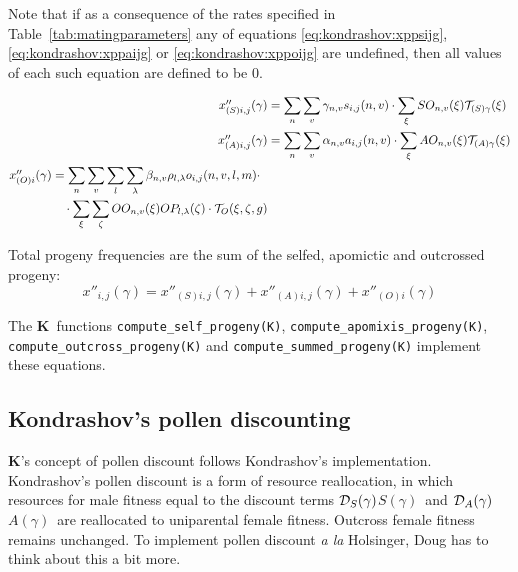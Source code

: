 \documentclass[10pt,twoside,a4paper,fleqn]{report}
\numberwithin{equation}{section}  %
\newcommand{\K}{{\bf K}}
\newcommand{\Kcode}[1]{{\tt #1}}
\newcommand{\xppsijg}{\mbox{$x''_{(S)i,j}(\gamma)$}}
\newcommand{\xppaijg}{\mbox{$x''_{(A)i,j}(\gamma)$}}
\newcommand{\xppoig}{\mbox{$x''_{(O)i}(\gamma)$}}
\newcommand{\xppoijg}{\xppoig}
\newcommand{\xppijg}{\mbox{$x''_{i,j}(\gamma)$}}
\newcommand{\Sg}{\mbox{$S(\gamma)$}}
\newcommand{\DSg}{\mbox{${\cal D}_{S}(\gamma)$}}
\newcommand{\Ag}{\mbox{$A(\gamma)$}}
\newcommand{\DAg}{\mbox{${\cal D}_{A}(\gamma)$}}
\newcommand{\betanv}{\mbox{$\beta_{n,v}$}}
\newcommand{\gammanv}{\mbox{$\gamma_{n,v}$}}
\newcommand{\alphanv}{\mbox{$\alpha_{n,v}$}}
\newcommand{\SOnvx}{\mbox{$SO_{n,v}(\xi)$}}
\newcommand{\AOnvx}{\mbox{$AO_{n,v}(\xi)$}}
\newcommand{\OOnvx}{\mbox{$OO_{n,v}(\xi)$}}
\newcommand{\funcself}{\mbox{$s_{i,j}(n,v)$}}
\newcommand{\funcapomixis}{\mbox{$a_{i,j}(n,v)$}}
\newcommand{\funcoutcross}{\mbox{$o_{i,j}(n,v,l,m)$}}
\newcommand{\TSgx}{\mbox{$\mathcal{T}_{(S)\gamma}(\xi)$}}
\newcommand{\TAgx}{\mbox{$\mathcal{T}_{(A)\gamma}(\xi)$}}
\begin{document}
{Note that if as a consequence of the rates specified in Table~\ref{tab:matingparameters} any of equations \eqref{eq:kondrashov:xppsijg}, \eqref{eq:kondrashov:xppaijg} or \eqref{eq:kondrashov:xppoijg} are undefined, then all values of each such equation are defined to be $0$.

\begin{align}
\label{eq:kondrashov:xppsijg}
\xppsijg &= 
\sum_{n}{
							\sum_{v}{
								\gammanv \funcself \cdot
									\sum_{\xi}{
										\SOnvx \TSgx
									}
						}}
    \\
\label{eq:kondrashov:xppaijg}
\xppaijg &= \sum_{n}{
							\sum_{v}{
								\alphanv \funcapomixis \cdot
									\sum_{\xi}{
										\AOnvx \TAgx
									}
						}}
    \\
\begin{split}
\label{eq:kondrashov:xppoijg}
\xppoijg &= \sum_{n}{
							\sum_{v}{
								\sum_{l}{
									\sum_{\lambda}{
										\betanv \rhollam \funcoutcross 
						}}}} \cdot \\
				&\quad \cdot	\sum_{\xi}{
												\sum_{\zeta}{
													\OOnvx \OPllamz \cdot \TOgxz
											}}
\end{split}
\end{align}

Total progeny frequencies are the sum of the selfed, apomictic and outcrossed progeny:
\begin{equation}
\xppijg = \xppsijg + \xppaijg + \xppoijg
\end{equation}

The \K\ functions \Kcode{compute\_self\_progeny(K)}, 
\Kcode{compute\_apomixis\_progeny(K)}, \\
\Kcode{compute\_outcross\_progeny(K)} and \Kcode{compute\_summed\_progeny(K)} implement these equations.

\subsection{Kondrashov's pollen discounting}

\K's concept of pollen discount follows Kondrashov's implementation.  Kondrashov's pollen discount is a form of resource reallocation, in which resources for male fitness equal to the discount terms \DSg\Sg\ and \DAg\Ag\ are reallocated to uniparental female fitness.  Outcross female fitness remains unchanged.  To implement pollen discount {\it a la} Holsinger, Doug has to think about this a bit more.



}
\end{document}
